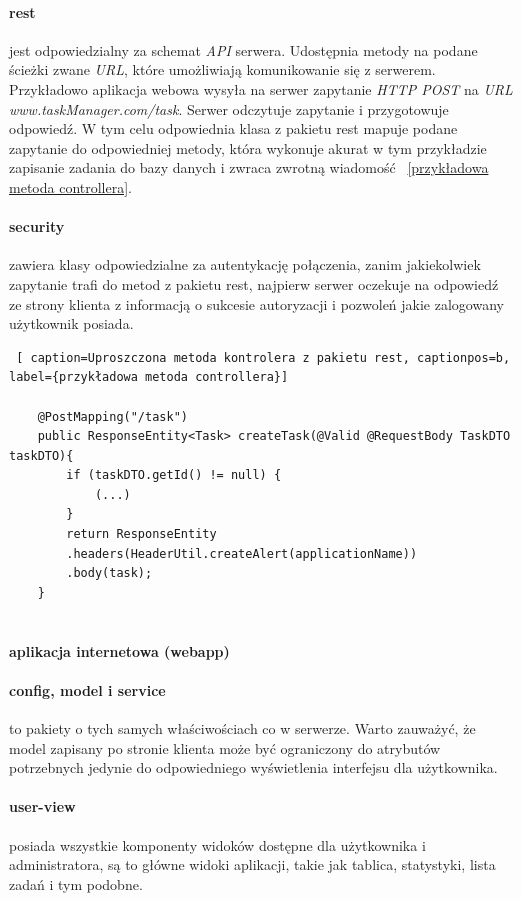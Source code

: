 \paragraph{rest}  jest odpowiedzialny za schemat \textit{API} serwera. Udostępnia  metody na podane ścieżki zwane \textit{URL}, które umożliwiają komunikowanie się z serwerem. Przykładowo aplikacja webowa wysyła na serwer zapytanie \textit{HTTP POST} na \textit{URL}
\textit{www.taskManager.com/task}. Serwer odczytuje zapytanie i przygotowuje odpowiedź. W tym celu odpowiednia klasa z pakietu rest mapuje podane zapytanie do odpowiedniej metody, która wykonuje akurat w tym przykładzie zapisanie zadania do bazy danych i zwraca zwrotną wiadomość ~\ref{przykładowa metoda controllera}.

\paragraph{security} zawiera klasy odpowiedzialne za autentykację połączenia, zanim jakiekolwiek zapytanie trafi do metod z pakietu rest, najpierw serwer oczekuje na odpowiedź ze strony klienta z informacją o sukcesie autoryzacji i pozwoleń jakie zalogowany użytkownik posiada.

\begin{lstlisting} [ caption=Uproszczona metoda kontrolera z pakietu rest, captionpos=b, label={przykładowa metoda controllera}]
	
	@PostMapping("/task")
	public ResponseEntity<Task> createTask(@Valid @RequestBody TaskDTO taskDTO){
		if (taskDTO.getId() != null) {
			(...)
		}
		return ResponseEntity
		.headers(HeaderUtil.createAlert(applicationName))
		.body(task);
	}
	
\end{lstlisting}

\paragraph{aplikacja internetowa (webapp)}
\paragraph{config, model i service} to pakiety o tych samych właściwościach co w serwerze. Warto zauważyć, że model zapisany po stronie klienta może być ograniczony do atrybutów potrzebnych jedynie do odpowiedniego wyświetlenia interfejsu dla użytkownika. 
\paragraph{user-view} posiada wszystkie komponenty widoków dostępne dla użytkownika i administratora, są to główne widoki aplikacji, takie jak tablica, statystyki, lista zadań i tym podobne.
